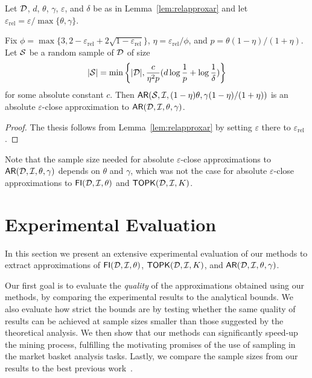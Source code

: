 \begin{lemma}\label{lem:absapproxar}
Let ${\cal D}$, $d$, $\theta$, $\gamma$, $\varepsilon$, and $\delta$ be as in
Lemma~\ref{lem:relapproxar}
and let $\varepsilon_\mathrm{rel}=\varepsilon/\max\{\theta,\gamma\}$.

Fix
$\phi=\max\{3,2-\varepsilon_\mathrm{rel}+2\sqrt{1-\varepsilon_\mathrm{rel}}\}$,
$\eta=\varepsilon_\mathrm{rel}/\phi$,
and $p=\theta(1-\eta)/(1+\eta)$. Let ${\cal S}$ be a random sample of ${\cal D}$ of
size 
\[
|{\cal S}|=\min\left\{|{\cal D}|,\frac{c}{\eta^2p}(d\log\frac{1}{p}+\log\frac{1}{\delta})\right\}\]
for some absolute constant $c$. Then
$\mathsf{AR}({\cal S},{\cal I},(1-\eta)\theta,\gamma(1-\eta)/(1+\eta))$ is an absolute
$\varepsilon$-close approximation to $\mathsf{AR}({\cal D},{\cal I},\theta,\gamma)$.
\end{lemma}

\begin{proof}
  The thesis follows from Lemma~\ref{lem:relapproxar} by setting $\varepsilon$
  there to $\varepsilon_\mathrm{rel}$.
\end{proof}

Note that the sample size needed for absolute $\varepsilon$-close
approximations to $\mathsf{AR}({\cal D},{\cal I},\theta,\gamma)$ depends on $\theta$ and
$\gamma$, which was not the case for absolute $\varepsilon$-close approximations
to $\mathsf{FI}({\cal D},{\cal I},\theta)$ and $\mathsf{TOPK}({\cal D},{\cal I},K)$.

\section{Experimental Evaluation}\label{sec:exp}
In this section we present an extensive experimental evaluation of
our methods to extract approximations of $\mathsf{FI}({\cal D},{\cal I},\theta)$, $\mathsf{TOPK}({\cal D},{\cal I},K)$, and
$\mathsf{AR}({\cal D},{\cal I},\theta,\gamma)$.

Our first goal is to evaluate the \emph{quality} of the
approximations obtained using our methods, by comparing the experimental results 
to the analytical bounds. We also evaluate how strict the bounds are
 by testing whether the same quality of results can be
achieved at sample sizes smaller than those suggested by the theoretical analysis. 
We then show that our methods can significantly speed-up the mining process,
fulfilling the motivating promises of the use of sampling in the market basket
analysis tasks. Lastly, we compare the sample sizes from our results to the best
previous work~\citep{ChakaravarthyPS09}.

